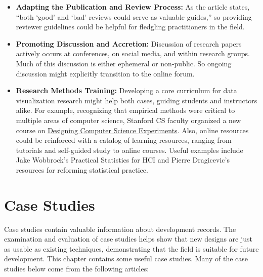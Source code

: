 \documentclass[]{book}
\providecommand{\tightlist}{%
  \setlength{\itemsep}{0pt}\setlength{\parskip}{0pt}}
\theoremstyle{definition}
\theoremstyle{definition}
\theoremstyle{definition}
\theoremstyle{remark}
\begin{document}
\begin{itemize}
\tightlist
\item
  \textbf{Adapting the Publication and Review Process:} As the article
  states, ``both `good' and `bad' reviews could serve as valuable
  guides,'' so providing reviewer guidelines could be helpful for
  fledgling practitioners in the field.
\item
  \textbf{Promoting Discussion and Accretion:} Discussion of research
  papers actively occurs at conferences, on social media, and within
  research groups. Much of this discussion is either ephemeral or
  non-public. So ongoing discussion might explicitly transition to the
  online forum.
\item
  \textbf{Research Methods Training:} Developing a core curriculum for
  data visualization research might help both cases, guiding students
  and instructors alike. For example, recognizing that empirical methods
  were critical to multiple areas of computer science, Stanford CS
  faculty organized a new course on
  \href{http://sing.stanford.edu/cs303-sp11/}{Designing Computer Science
  Experiments}. Also, online resources could be reinforced with a
  catalog of learning resources, ranging from tutorials and self-guided
  study to online courses. Useful examples include Jake Wobbrock's
  Practical Statistics for HCI and Pierre Dragicevic's resources for
  reforming statistical practice.
\end{itemize}

\chapter{Case Studies}\label{case-studies}

Case studies contain valuable information about development records. The
examination and evaluation of case studies helps show that new designs
are just as usable as existing techniques, demonstrating that the field
is suitable for future development. This chapter contains some useful
case studies. Many of the case studies below come from the following
articles:
\end{document}
